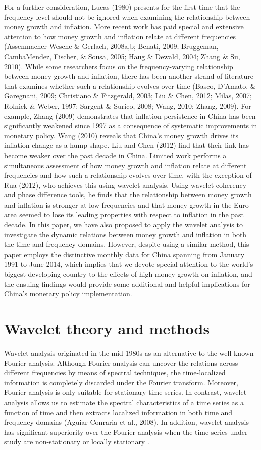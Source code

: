 \documentclass[a4paper,fleqn]{cas-sc}
\begin{document}
For a further consideration, Lucas (1980) presents for the first time that the frequency level should not be ignored when examining the relationship between money growth and inflation. More recent work has paid special and extensive attention to how money growth and inflation relate at different frequencies (Assenmacher-Wesche \& Gerlach, 2008a,b; Benati, 2009; Bruggeman, CambaMendez, Fischer, \& Sousa, 2005; Haug \& Dewald, 2004; Zhang \& Su, 2010). While some researchers focus on the frequency-varying relationship between money growth and inflation, there has been another strand of literature that examines whether such a relationship evolves over time (Basco, D'Amato, \& Garegnani, 2009; Christiano \& Fitzgerald, 2003; Liu \& Chen, 2012; Milas, 2007; Rolnick \& Weber, 1997; Sargent \& Surico, 2008; Wang, 2010; Zhang, 2009). For example, Zhang (2009) demonstrates that inflation persistence in China has been significantly weakened since 1997 as a consequence of systematic improvements in monetary policy. Wang (2010) reveals that China's money growth drives its inflation change as a hump shape. Liu and Chen (2012) find that their link has become weaker over the past decade in China.
Limited work performs a simultaneous assessment of how money growth and inflation relate at different frequencies and how such a relationship evolves over time, with the exception of Rua (2012), who achieves this using wavelet analysis. Using wavelet coherency and phase difference tools, he finds that the relationship between money growth and inflation is stronger at low frequencies and that money growth in the Euro area seemed to lose its leading properties with respect to inflation in the past decade. In this paper, we have also proposed to apply the wavelet analysis to investigate the dynamic relations between money growth and inflation in both the time and frequency domains. However, despite using a similar method, this paper employs the distinctive monthly data for China spanning from January 1991 to June 2014, which implies that we devote special attention to the world's biggest developing country to the effects of high money growth on inflation, and the ensuing findings would provide some additional and helpful implications for China's monetary policy implementation.

\section{Wavelet theory and methods}
Wavelet analysis originated in the mid-1980s as an alternative to the well-known Fourier analysis. Although Fourier analysis can uncover the relations across different frequencies by means of spectral techniques, the time-localized information is completely discarded under the Fourier transform. Moreover, Fourier analysis is only suitable for stationary time series. In contrast, wavelet analysis allows us to estimate the spectral characteristics of a time series as a function of time and then extracts localized information in both time and frequency domains (Aguiar-Conraria et al., 2008). In addition, wavelet analysis has significant superiority over the Fourier analysis when the time series under study are non-stationary or locally stationary \cite{ROUEFF2011813}.
\end{document}
